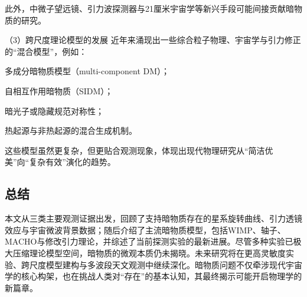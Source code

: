 此外，中微子望远镜、引力波探测器与21厘米宇宙学等新兴手段可能间接贡献暗物质的研究。

（3）跨尺度理论模型的发展
近年来涌现出一些综合粒子物理、宇宙学与引力修正的“混合模型”，例如：

多成分暗物质模型（multi-component DM）；

自相互作用暗物质（SIDM）；

暗光子或隐藏规范对称性；

热起源与非热起源的混合生成机制。

这些模型虽然更复杂，但更贴合观测现象，体现出现代物理研究从“简洁优美”向“复杂有效”演化的趋势。

\subsection{总结}

本文从三类主要观测证据出发，回顾了支持暗物质存在的星系旋转曲线、引力透镜效应与宇宙微波背景数据；随后介绍了主流暗物质模型，包括WIMP、轴子、MACHO与修改引力理论，并综述了当前探测实验的最新进展。尽管多种实验已极大压缩理论模型空间，暗物质的微观本质仍未揭晓。未来研究将在更高灵敏度实验、跨尺度模型建构与多波段天文观测中继续深化。暗物质问题不仅牵涉现代宇宙学的核心构架，也在挑战人类对“存在”的基本认知，其最终揭示可能开启物理学的新篇章。

\newpage